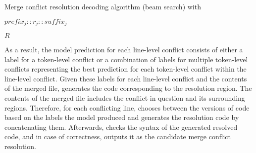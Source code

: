 \begin{algorithm*}
    \caption{Merge conflict resolution decoding algorithm (beam search) with \thistool{}}\label{alg:decoding}
\begin{algorithmic}
 
 

      
    
        \Return $prefix_j :: r_j :: suffix_j$
    \Else
             
        
        \EndFor
         
    \EndIf
\EndFor
{} 
\newline
\Return $R$
\end{algorithmic}
\end{algorithm*}
As a result, the model prediction for each line-level conflict consists of either a label for a token-level conflict or a combination of labels for multiple token-level conflicts representing the best prediction for each token-level conflict within the line-level conflict. Given these labels for each line-level conflict and the contents of the merged file, \thistool{} generates the code corresponding to the resolution region. The contents of the merged file includes the conflict in question and its surrounding regions. Therefore, for each conflicting line, \thistool{} chooses between the versions of code based on the labels the model produced and generates the resolution code by concatenating them. Afterwards, \thistool{} checks the syntax of the generated resolved code, and in case of correctness, outputs it as the candidate merge conflict resolution.

